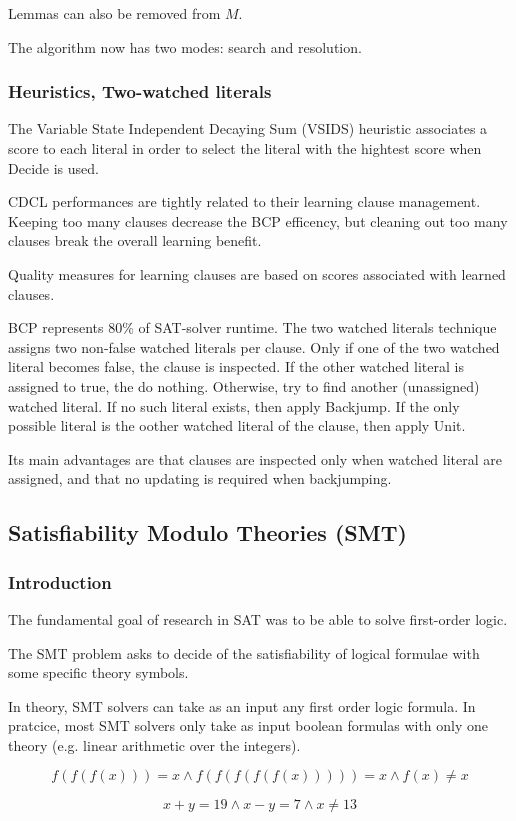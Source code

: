 \documentclass[toc, titlepaged]{../cs-classes/cs-classes}
\begin{document}
Lemmas can also be removed from $M$.

The algorithm now has two modes: search and resolution. 

\subsubsection{Heuristics, Two-watched literals}
The Variable State Independent Decaying Sum (VSIDS) heuristic associates a score to each literal in order to select the literal with the hightest score when Decide is used.

CDCL performances are tightly related to their learning clause management. Keeping too many clauses decrease the BCP efficency, but cleaning out too many clauses break the overall learning benefit.

Quality measures for learning clauses are based on scores associated with learned clauses. 

BCP represents 80\% of SAT-solver runtime. The two watched literals technique assigns two non-false watched literals per clause. Only if one of the two watched literal becomes false, the clause is inspected. If the other watched literal is assigned to true, the do nothing. Otherwise, try to find another (unassigned) watched literal. If no such literal exists, then apply Backjump. If the only possible literal is the oother watched literal of the clause, then apply Unit.

Its main advantages are that clauses are inspected only when watched literal are assigned, and that no updating is required when backjumping.

\subsection{Satisfiability Modulo Theories (SMT)}
\subsubsection{Introduction}
The fundamental goal of research in SAT was to be able to solve first-order logic.

The SMT problem asks to decide of the satisfiability of logical formulae with some specific theory symbols. 

In theory, SMT solvers can take as an input any first order logic formula. In pratcice, most SMT solvers only take as input boolean formulas with only one theory (e.g. linear arithmetic over the integers).

\begin{example}
    \begin{equation*}
        f(f(f(x))) = x \land f(f(f(f(f(x))))) = x \land f(x) \neq x
    \end{equation*}

    \begin{equation*}
        x+y = 19 \land x-y=7 \land x\neq 13
    \end{equation*}
\end{example}
\end{document}
